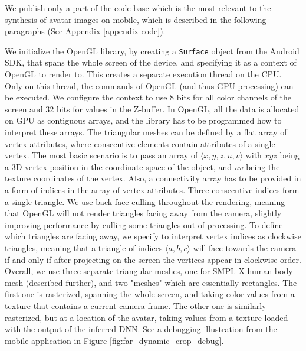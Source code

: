 We publish only a part of the code base which is the most relevant to the synthesis of avatar images on mobile, which is described in the following paragraphs (See Appendix \ref{appendix-code}).

We initialize the OpenGL library, by creating a \verb|Surface| object from the Android SDK, that spans the whole screen of the device, and specifying it as a context of OpenGL to render to. This creates a separate execution thread on the CPU. Only on this thread, the commands of OpenGL (and thus GPU processing) can be executed. We configure the context to use 8 bits for all color channels of the screen and 32 bits for values in the Z-buffer. In OpenGL, all the data is allocated on GPU as contiguous arrays, and the library has to be programmed how to interpret these arrays. The triangular meshes can be defined by a flat array of vertex attributes, where consecutive elements contain attributes of a single vertex. The most basic scenario is to pass an array of $\langle x, y, z, u, v\rangle$ with $xyz$ being a 3D vertex position in the coordinate space of the object, and $uv$ being the texture coordinates of the vertex. Also, a connectivity array has to be provided in a form of indices in the array of vertex attributes. Three consecutive indices form a single triangle. We use back-face culling throughout the rendering, meaning that OpenGL will not render triangles facing away from the camera, slightly improving performance by culling some triangles out of processing. To define which triangles are facing away, we specify to interpret vertex indices as clockwise triangles, meaning that a triangle of indices $\langle a, b, c\rangle$ will face towards the camera if and only if after projecting on the screen the vertices appear in clockwise order. Overall, we use three separate triangular meshes, one for SMPL-X human body mesh (described further), and two "meshes" which are essentially rectangles. The first one is rasterized, spanning the whole screen, and taking color values from a texture that contains a current camera frame. The other one is similarly rasterized, but at a location of the avatar, taking values from a texture loaded with the output of the inferred DNN. See a debugging illustration from the mobile application in Figure \ref{fig:far_dynamic_crop_debug}.

